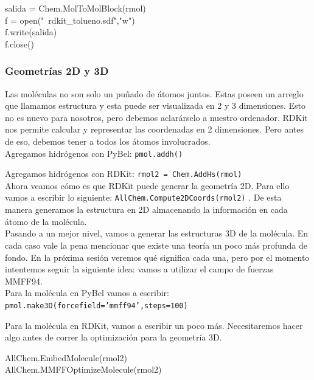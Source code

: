 \documentclass[10pt,letterpaper]{article}
\newcommand{\inlinecode}[1]{
\colorbox{light-gray}{\texttt{#1}}
}
\newenvironment{Code}
{
\begin{lrbox}{\selvestebox}%
\begin{minipage}{\dimexpr\columnwidth-2\fboxsep\relax}
\fontfamily{\ttdefault}\selectfont
}
{\end{minipage}\end{lrbox}%
\begin{center}
\colorbox{light-gray}{\usebox{\selvestebox}}
\end{center}
}
\begin{document}
\begin{Code}
salida = Chem.MolToMolBlock(rmol)\\
f = open("\ \hspace*{-2mm}rdkit\_tolueno.sdf","w")\\
f.write(salida)\\
f.close()
\end{Code}

\subsubsection{Geometr\'ias 2D y 3D}

Las mol\'eculas no son solo un pu\~nado de \'atomos juntos. Estas poseen un arreglo que llamamos estructura y esta puede ser visualizada en 2 y 3 dimensiones. Esto no es nuevo para nosotros, pero debemos aclar\'arselo a nuestro ordenador. RDKit nos permite calcular y representar las coordenadas en 2 dimensiones. Pero antes de eso, debemos tener a todos los \'atomos involucrados.\\

\noindent Agregamos hidr\'ogenos con PyBel: \inlinecode{pmol.addh()}

\noindent Agregamos hidr\'ogenos con RDKit: \inlinecode{rmol2 = Chem.AddHs(rmol)}\\

Ahora veamos c\'omo es que RDKit puede generar la geometr\'ia 2D. Para ello vamos a escribir lo siguiente: \inlinecode{AllChem.Compute2DCoords(rmol2)}. De esta manera generamos la estructura en 2D almacenando la informaci\'on en cada \'atomo de la mol\'ecula.\\

Pasando a un mejor nivel, vamos a generar las estructuras 3D de la mol\'ecula. En cada caso vale la pena mencionar que existe una teor\'ia un poco m\'as profunda de fondo. En la pr\'oxima sesi\'on veremos qu\'e significa cada una, pero por el momento intentemos seguir la siguiente idea: vamos a utilizar el campo de fuerzas MMFF94.\\

\noindent Para la mol\'ecula en PyBel vamos a escribir: \inlinecode{pmol.make3D(forcefield='mmff94',steps=100)}

\noindent Para la mol\'ecula en RDKit, vamos a escribir un poco m\'as. Necesitaremos hacer algo antes de correr la optimizaci\'on para la geometr\'ia 3D.

\begin{Code}
AllChem.EmbedMolecule(rmol2)\\
AllChem.MMFFOptimizeMolecule(rmol2)
\end{Code}
\end{document}
